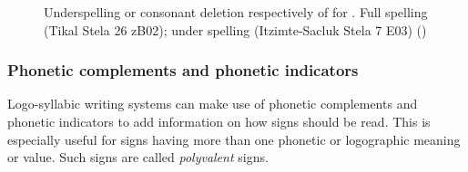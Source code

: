 \documentclass[../main.tex]{subfiles}
\begin{document}
\begin{figure}[ht!]
    \centering
    \caption[Underspelling]{Underspelling or consonant deletion respectively of 
             for .
             Full spelling  (Tikal Stela 26 zB02);
             under spelling  (Itzimte-Sacluk Stela 7 E03) (\authordrawings)}
    \label{fig:terminology-underspelling-example}
\end{figure}

\subsubsection{Phonetic complements and phonetic indicators}
Logo-syllabic writing systems can make use of phonetic complements and phonetic indicators to
add information on how signs should be read.
This is especially useful for signs having more than one phonetic or logographic meaning or value.
Such signs are called \emph{polyvalent} signs.
\end{document}
